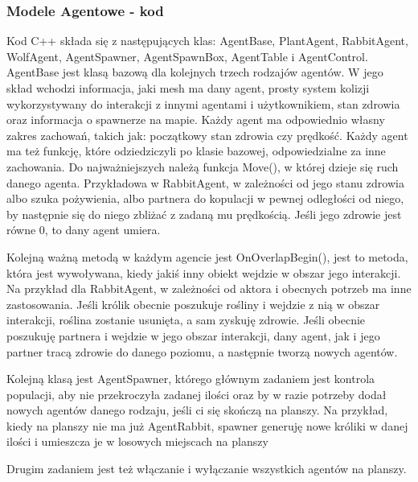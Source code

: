 \documentclass[a4paper,12pt,reqno]{article}
\begin{document}
\subsubsection{Modele Agentowe - kod}

Kod C++ składa się z następujących klas: AgentBase, PlantAgent, RabbitAgent, WolfAgent, AgentSpawner, AgentSpawnBox, AgentTable i AgentControl. 
AgentBase jest klasą bazową dla kolejnych trzech rodzajów agentów. W jego skład wchodzi informacja, jaki mesh ma dany agent, prosty system kolizji wykorzystywany do interakcji z innymi agentami i użytkownikiem, stan zdrowia oraz informacja o spawnerze na mapie. Każdy agent ma odpowiednio własny zakres zachowań, takich jak: początkowy stan zdrowia czy prędkość. Każdy agent ma też funkcję, które odziedziczyli po klasie bazowej, odpowiedzialne za inne zachowania. Do najważniejszych należą funkcja Move(), w której dzieje się ruch danego agenta. Przykładowa w RabbitAgent, w zależności od jego stanu zdrowia albo szuka pożywienia, albo partnera do kopulacji w pewnej odległości od niego, by następnie się do niego zbliżać z zadaną mu prędkością. Jeśli jego zdrowie jest równe 0, to dany agent umiera.



Kolejną ważną metodą w każdym agencie jest OnOverlapBegin(), jest to metoda, która jest wywoływana, kiedy jakiś inny obiekt wejdzie w obszar jego interakcji. Na przykład dla RabbitAgent, w zależności od aktora i obecnych potrzeb ma inne zastosowania. Jeśli królik obecnie poszukuje rośliny i wejdzie z nią w obszar interakcji, roślina zostanie usunięta, a sam zyskuję zdrowie. Jeśli obecnie poszukuję partnera i wejdzie w jego obszar interakcji, dany agent, jak i jego partner tracą zdrowie do danego poziomu, a następnie tworzą nowych agentów.
	


Kolejną klasą jest AgentSpawner, którego głównym zadaniem jest kontrola populacji, aby nie przekroczyła zadanej ilości oraz by w razie potrzeby dodał nowych agentów danego rodzaju, jeśli ci się skończą na planszy. Na przykład, kiedy na planszy nie ma już AgentRabbit, spawner generuję nowe króliki w danej ilości i umieszcza je w losowych miejscach na planszy


Drugim zadaniem jest też włączanie i wyłączanie wszystkich agentów na planszy.
\end{document}
